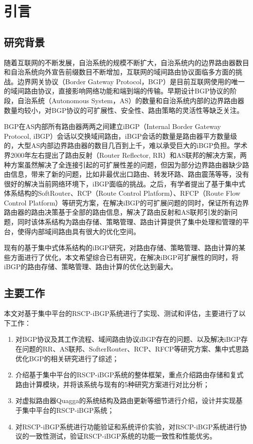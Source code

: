 \chapter{引言}
\label{cha:intro}


\section{研究背景}

随着互联网的不断发展，自治系统的规模不断扩大，自治系统内的边界路由器数目和自治系统向外宣告前缀数目不断增加，互联网的域间路由协议面临多方面的挑战。边界网关协议（Border Gateway Protocol，BGP）是目前互联网使用的唯一的域间路由协议，直接影响网络功能和端到端的传输。早期设计BGP协议的阶段，自治系统（Autonomous System，AS）的数量和自治系统内部的边界路由器数量均较小，对BGP协议的可扩展性、安全性、路由策略的灵活性等缺乏关注。

BGP在AS内部所有路由器两两之间建立iBGP（Internal Border Gateway Protocol, iBGP）会话以交换域间路由，iBGP会话的数量是路由器平方数量级的，大型AS内部边界路由器的数目几百到上千，难以承受巨大的iBGP负担。学术界2000年左右提出了路由反射（Router Reflector, RR）和AS联邦的解决方案，两种方案虽然解决了全连接引起的可扩展性差的问题，但因为部分边界路由器缺少路由信息，带来了新的问题，比如非最优出口路由、转发环路、路由震荡等等，没有很好的解决当前网络环境下，iBGP面临的挑战。之后，有学者提出了基于集中式体系结构的SoftRouter、RCP（Route Control Platform）、RFCP（Route Flow Control Platform）等研究方案，在解决iBGP的可扩展问题的同时，保证所有边界路由器的路由决策基于全部的路由信息，解决了路由反射和AS联邦引发的新问题，同时该体系结构为路由存储、策略管理、路由计算提供了集中处理和管理的平台，使得内部域间路由具有很大的优化空间。

现有的基于集中式体系结构的iBGP研究，对路由存储、策略管理、路由计算的某些方面进行了优化，本文希望综合已有研究，在解决iBGP可扩展性的同时，将iBGP的路由存储、策略管理、路由计算的优化达到最大。

\section{主要工作}

本文对基于集中平台的RSCP-iBGP系统进行了实现、测试和评估，主要进行了以下工作：
\begin{enumerate}
\item 对BGP协议及其工作流程、域间路由协议iBGP存在的问题、以及解决iBGP存在问题的RR、AS联邦、SofterRouter、RCP、RFCP等研究方案、集中式思路优化BGP的相关研究进行了综述；
\item 介绍基于集中平台的RSCP-iBGP系统的整体框架，重点介绍路由存储和复式路由计算模块，并将该系统与现有的5种研究方案进行对比分析；
\item 对虚拟路由器Quagga的系统结构及路由更新等细节进行介绍，设计并实现基于集中平台的RSCP-iBGP系统；
\item 对RSCP-iBGP系统进行功能验证和系统评价实验，对RSCP-iBGP系统进行协议的一致性测试，验证RSCP-iBGP系统的功能一致性和性能优劣。
\end{enumerate}



